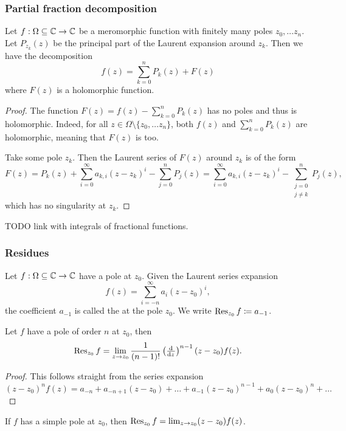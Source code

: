 \subsubsection{Partial fraction decomposition}
\begin{proposition} \label{partialFractionDecomposition}
Let $f: \Omega\subseteq \mathbb{C} \to \mathbb{C}$ be a meromorphic function with finitely many poles $z_0, \ldots z_n$. Let $P_{z_k}(z)$ be the principal part of the Laurent expansion around $z_k$. Then we have the decomposition
\[ f(z) = \sum_{k=0}^nP_k(z) + F(z) \]
where $F(z)$ is a holomorphic function.
\end{proposition}
\begin{proof}
The function $F(z) = f(z) - \sum_{k=0}^nP_k(z)$ has no poles and thus is holomorphic. Indeed, for all $z\in\Omega \setminus \{z_0, \ldots z_n\}$, both $f(z)$ and $\sum_{k=0}^nP_k(z)$ are holomorphic, meaning that $F(z)$ is too.

Take some pole $z_k$. Then the Laurent series of $F(z)$ around $z_k$ is of the form
\[ F(z) = P_k(z) + \sum_{i=0}^\infty a_{k,i}(z-z_k)^i - \sum_{j=0}^n P_j(z) = \sum_{i=0}^\infty a_{k,i}(z-z_k)^i - \sum_{\substack{j=0\\ j\neq k}}^n P_j(z), \]
which has no singularity at $z_k$.
\end{proof}

TODO link with integrals of fractional functions.

\subsubsection{Residues}
\begin{definition}
Let $f: \Omega\subseteq \mathbb{C} \to \mathbb{C}$ have a pole at $z_0$. Given the Laurent series expansion
\[  f(z) = \sum_{i=-n}^\infty a_i(z-z_0)^i, \]
the coefficient $a_{-1}$ is called the  at the pole $z_0$. We write $\operatorname{Res}_{z_0}f \coloneqq a_{-1}$.
\end{definition}

\begin{proposition}
Let $f$ have a pole of order $n$ at $z_0$, then
\[ \Res_{z_0}f = \lim_{z\to z_0}\frac{1}{(n-1)!}\left(\od{}{z}\right)^{n-1}(z-z_0)f(z). \]
\end{proposition}
\begin{proof}
This follows straight from the series expansion
\[ (z-z_0)^nf(z) = a_{-n} + a_{-n+1}(z-z_0) + \ldots + a_{-1}(z-z_0)^{n-1} + a_0(z-z_0)^n + \ldots \]
\end{proof}
\begin{corollary}
If $f$ has a simple pole at $z_0$, then $\operatorname{Res}_{z_0} f = \lim_{z\to z_0}(z-z_0)f(z)$.
\end{corollary}

